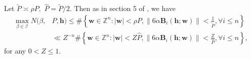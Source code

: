 \documentclass[12pt]{amsart}
\theoremstyle{definition}
\numberwithin{equation}{section}
\begin{document}
Let $\widetilde{P} \asymp \rho P,$ $\widehat{P}=\widetilde{P}/2.$
Then as in section 5 of \cite{heath2007cubic}, we have
\begin{equation*}
    \begin{split}
        \mathop{\max}_{\beta \in \mathcal{I}} N(\beta,& P, \boldsymbol{h})
        \leq \#\left\{\boldsymbol{w}\in \mathbb{Z}^{n}:|\boldsymbol{w}|< \rho P, \left\|6\alpha\boldsymbol{B}_i(\boldsymbol{h};\boldsymbol{w})\right\| <\frac{1}{\widetilde{P}},  \forall i \leq n\right\}\\
        &\ll Z^{-n}\#\left\{\boldsymbol{w}\in \mathbb{Z}^{n}:|\boldsymbol{w}|<Z\widehat{P}, \left\|6\alpha\boldsymbol{B}_i(\boldsymbol{h};\boldsymbol{w})\right\| <\frac{Z}{\widehat{P}},  \forall i \leq n\right\},
    \end{split}
\end{equation*}
for any $0<Z \leq 1.$
\end{document}
